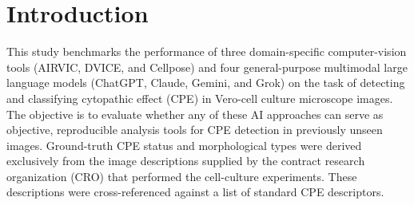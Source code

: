 \section*{Introduction}
\label{sec:intro}
This study benchmarks the performance of three domain-specific computer-vision tools (AIRVIC, DVICE, and Cellpose) and four general-purpose multimodal large language models (ChatGPT, Claude, Gemini, and Grok) on the task of detecting and classifying cytopathic effect (CPE) in Vero-cell culture microscope images. The objective is to evaluate whether any of these AI approaches can serve as objective, reproducible analysis tools for CPE detection in previously unseen images. Ground-truth CPE status and morphological types were derived exclusively from the image descriptions supplied by the contract research organization (CRO) that performed the cell-culture experiments. These descriptions were cross-referenced against a list of standard CPE descriptors.